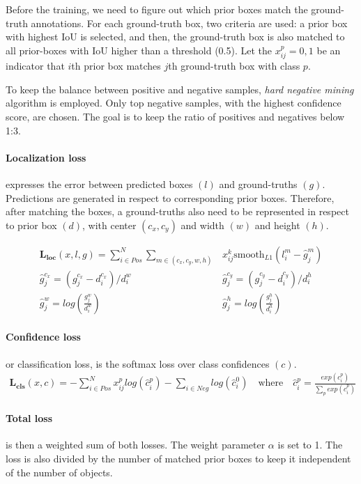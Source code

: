 Before the training, we need to figure out which prior boxes match the ground-truth annotations. For each ground-truth box, two criteria are used: a prior box with highest IoU is selected, and then, the ground-truth box is also matched to all prior-boxes with IoU higher than a threshold (0.5). Let the $x_{ij}^p = {0,1}$ be an indicator that $i$th prior box matches $j$th ground-truth box with class $p$.

To keep the balance between positive and negative samples, \textit{hard negative mining} algorithm is employed. Only top negative samples, with the highest confidence score, are chosen. The goal is to keep the ratio of positives and negatives below 1:3.

\paragraph{Localization loss} expresses the error between predicted boxes $(l)$ and ground-truths $(g)$. Predictions are generated in respect to corresponding prior boxes. Therefore, after matching the boxes, a ground-truths also need to be represented in respect to prior box $(d)$, with center $(c_x,c_y)$ and width $(w)$ and height $(h)$.

\begin{align*}
\mathbf{L_{\text{loc}}}(x,l,g) = \sum_{i\in Pos}^N \sum_{m\in(c_x, c_y, w, h)} &x_{ij}^k\text{smooth}_{L1}(l_i^m-\hat{g}_j^m) \\
\hat{g}_j^{c_x} = (g_j^{c_x} - d_i^{c_x}) / d_i^{w} \qquad& \hat{g}_j^{c_y} = (g_j^{c_y} - d_i^{c_y}) / d_i^{h} \\
\hat{g}_j^{w} = log(\frac{g_j^{w}}{d_i^w}) \qquad& \hat{g}_j^{h} = log(\frac{g_j^{h}}{d_i^h})
\end{align*}

\paragraph{Confidence loss} or classification loss, is the softmax loss over class confidences $(c)$.
\begin{align*}
\mathbf{L_{\text{cls}}}(x,c) = -\sum_{i\in Pos}^N x_{ij}^p log(\hat{c}_i^p) - \sum_{i \in Neg} log(\hat{c}_i^0) \quad\text{where} \quad\hat{c}_i^p = \frac{exp(c_i^p)}{\sum_p exp(c_i^p)}
\end{align*}

\paragraph{Total loss} is then a weighted sum of both losses. The weight parameter $\alpha$ is set to 1. The loss is also divided by the number of matched prior boxes to keep it independent of the number of objects.

